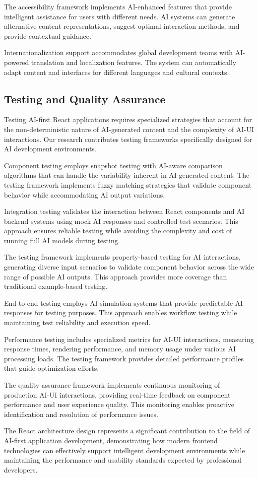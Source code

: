 The accessibility framework implements AI-enhanced features that provide intelligent assistance for users with different needs. AI systems can generate alternative content representations, suggest optimal interaction methods, and provide contextual guidance.

Internationalization support accommodates global development teams with AI-powered translation and localization features. The system can automatically adapt content and interfaces for different languages and cultural contexts.

\subsection*{Testing and Quality Assurance}

Testing AI-first React applications requires specialized strategies that account for the non-deterministic nature of AI-generated content and the complexity of AI-UI interactions. Our research contributes testing frameworks specifically designed for AI development environments.

Component testing employs snapshot testing with AI-aware comparison algorithms that can handle the variability inherent in AI-generated content. The testing framework implements fuzzy matching strategies that validate component behavior while accommodating AI output variations.

Integration testing validates the interaction between React components and AI backend systems using mock AI responses and controlled test scenarios. This approach ensures reliable testing while avoiding the complexity and cost of running full AI models during testing.

\begin{infobox}[title=Testing Strategy]
The testing framework implements property-based testing for AI interactions, generating diverse input scenarios to validate component behavior across the wide range of possible AI outputs. This approach provides more coverage than traditional example-based testing.
\end{infobox}

End-to-end testing employs AI simulation systems that provide predictable AI responses for testing purposes. This approach enables workflow testing while maintaining test reliability and execution speed.

Performance testing includes specialized metrics for AI-UI interactions, measuring response times, rendering performance, and memory usage under various AI processing loads. The testing framework provides detailed performance profiles that guide optimization efforts.

The quality assurance framework implements continuous monitoring of production AI-UI interactions, providing real-time feedback on component performance and user experience quality. This monitoring enables proactive identification and resolution of performance issues.

The React architecture design represents a significant contribution to the field of AI-first application development, demonstrating how modern frontend technologies can effectively support intelligent development environments while maintaining the performance and usability standards expected by professional developers.
